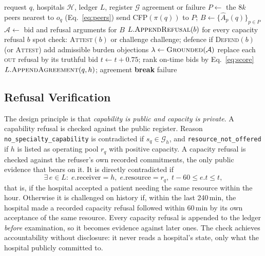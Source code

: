 \begin{algorithm}[!t]
\caption{\mahros{} negotiation for request $q$ at time $t$}
\label{alg:mahros}
\small
\begin{algorithmic}[1]
\Require request $q$, hospitals $\mathcal{H}$, ledger $L$, register $\mathcal{G}$
\Ensure agreement or failure
  \State $P \gets$ the $8k$ peers nearest to $o_q$ (Eq.~\ref{eq:peers})
  \State send CFP$(\pi(q))$ to $P$; $B\gets\{\hat{A}_p(q)\}_{p\in P}$
  \State $\mathcal{A}\gets$ bid and refusal arguments for $B$
  \State $L.\textsc{AppendRefusal}(b)$ for every capacity refusal $b$
      \State spot check: \textsc{Attest}$(b)$ or challenge
      \State challenge; defence if \textsc{Defend}$(b)$ (or \textsc{Attest})
    \EndIf
  \EndFor
  \State add admissible burden objections
  \State $\lambda\gets\textsc{Grounded}(\mathcal{A})$
  \State replace each \textsc{out} refusal by its truthful bid
  \State $t\gets t+0.75$; rank on-time bids by Eq.~\eqref{eq:score}
     \State $L.\textsc{AppendAgreement}(q,h)$; \Return agreement \EndIf
  \EndFor
   \textbf{break} \EndIf
\EndFor
\State \Return failure
\end{algorithmic}
\end{algorithm}

\subsection{Refusal Verification}
\label{sec:verify}
The design principle is that \emph{capability is public and capacity is private}. A capability refusal is checked against the public register. Reason \texttt{no\_specialty\_capability} is contradicted if $s_q\in\mathcal{G}_h$, and \texttt{resource\_not\_offered} if $h$ is listed as operating pool $r_q$ with positive capacity. A capacity refusal is checked against the refuser's own recorded commitments, the only public evidence that bears on it. It is directly contradicted if
\begin{equation}
  \exists\, e\in L:\; e.\text{receiver}=h,\; e.\text{resource}=r_q,\; t-60\le e.t\le t ,
  \label{eq:direct}
\end{equation}
that is, if the hospital accepted a patient needing the same resource within the hour. Otherwise it is challenged on history if, within the last 240\,min, the hospital made a recorded capacity refusal followed within 60\,min by its own acceptance of the same resource. Every capacity refusal is appended to the ledger \emph{before} examination, so it becomes evidence against later ones. The check achieves accountability without disclosure: it never reads a hospital's state, only what the hospital publicly committed to.

